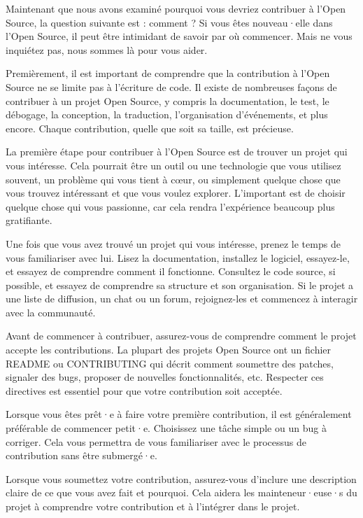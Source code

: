 Maintenant que nous avons examiné pourquoi vous devriez contribuer à l'Open Source, la question suivante est : comment ? Si vous êtes nouveau·elle dans l'Open Source, il peut être intimidant de savoir par où commencer. Mais ne vous inquiétez pas, nous sommes là pour vous aider.

Premièrement, il est important de comprendre que la contribution à l'Open Source ne se limite pas à l'écriture de code. Il existe de nombreuses façons de contribuer à un projet Open Source, y compris la documentation, le test, le débogage, la conception, la traduction, l'organisation d'événements, et plus encore. Chaque contribution, quelle que soit sa taille, est précieuse.

La première étape pour contribuer à l'Open Source est de trouver un projet qui vous intéresse. Cela pourrait être un outil ou une technologie que vous utilisez souvent, un problème qui vous tient à cœur, ou simplement quelque chose que vous trouvez intéressant et que vous voulez explorer. L'important est de choisir quelque chose qui vous passionne, car cela rendra l'expérience beaucoup plus gratifiante.

Une fois que vous avez trouvé un projet qui vous intéresse, prenez le temps de vous familiariser avec lui. Lisez la documentation, installez le logiciel, essayez-le, et essayez de comprendre comment il fonctionne. Consultez le code source, si possible, et essayez de comprendre sa structure et son organisation. Si le projet a une liste de diffusion, un chat ou un forum, rejoignez-les et commencez à interagir avec la communauté.

Avant de commencer à contribuer, assurez-vous de comprendre comment le projet accepte les contributions. La plupart des projets Open Source ont un fichier README ou CONTRIBUTING qui décrit comment soumettre des patches, signaler des bugs, proposer de nouvelles fonctionnalités, etc. Respecter ces directives est essentiel pour que votre contribution soit acceptée.

Lorsque vous êtes prêt·e à faire votre première contribution, il est généralement préférable de commencer petit·e. Choisissez une tâche simple ou un bug à corriger. Cela vous permettra de vous familiariser avec le processus de contribution sans être submergé·e.

Lorsque vous soumettez votre contribution, assurez-vous d'inclure une description claire de ce que vous avez fait et pourquoi. Cela aidera les mainteneur·euse·s du projet à comprendre votre contribution et à l'intégrer dans le projet.


